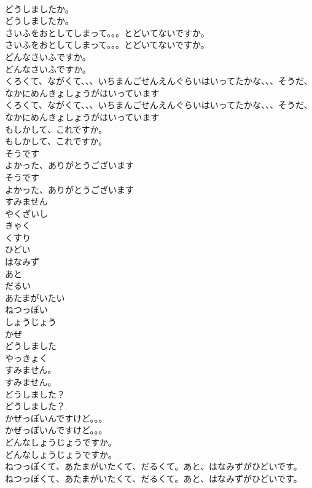 \documentclass[8pt]{extreport}
\begin{document}
\begin{CJK}{UTF8}{min}
\\	どうしましたか。
\\	どうしましたか。
\\	さいふをおとしてしまって。。。とどいてないですか。
\\	さいふをおとしてしまって。。。とどいてないですか。
\\	どんなさいふですか。
\\	どんなさいふですか。
\\	くろくて、ながくて、、、いちまんごせんえんぐらいはいってたかな、、、そうだ、なかにめんきょしょうがはいっています
\\	くろくて、ながくて、、、いちまんごせんえんぐらいはいってたかな、、、そうだ、なかにめんきょしょうがはいっています
\\	もしかして、これですか。
\\	もしかして、これですか。
\\	そうです
\\	よかった、ありがとうございます
\\	そうです
\\	よかった、ありがとうございます
\\	すみません
\\	やくざいし
\\	きゃく
\\	くすり
\\	ひどい
\\	はなみず
\\	あと
\\	だるい
\\	あたまがいたい
\\	ねつっぽい
\\	しょうじょう
\\	かぜ
\\	どうしました
\\	やっきょく
\\	すみません。
\\	すみません。
\\	どうしました？
\\	どうしました？
\\	かぜっぽいんですけど。。。
\\	かぜっぽいんですけど。。。
\\	どんなしょうじょうですか。
\\	どんなしょうじょうですか。
\\	ねつっぽくて、あたまがいたくて、だるくて。あと、はなみずがひどいです。
\\	ねつっぽくて、あたまがいたくて、だるくて。あと、はなみずがひどいです。

\end{CJK}
\end{document}
